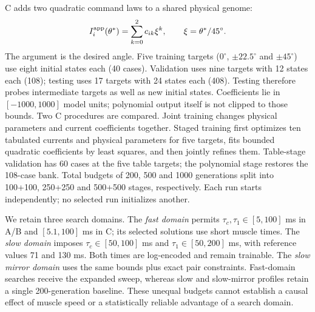 \documentclass{styles/svproc}
\begin{document}
C adds two quadratic command laws to a shared physical genome:
\begin{equation}
 I_i^{\rm app}(\theta^*)=\sum_{k=0}^{2}c_{ik}\xi^k,\qquad
 \xi=\theta^*/45^\circ.
 \label{eq:commands}
\end{equation}
The argument is the desired angle. Five training targets ($0^\circ$, $\pm22.5^\circ$ and $\pm45^\circ$) use eight initial states each (40 cases). Validation uses nine targets with 12 states each (108); testing uses 17 targets with 24 states each (408). Testing therefore probes intermediate targets as well as new initial states. Coefficients lie in $[-1000,1000]$ model units; polynomial output itself is not clipped to those bounds. Two C procedures are compared. Joint training changes physical parameters and current coefficients together. Staged training first optimizes ten tabulated currents and physical parameters for five targets, fits bounded quadratic coefficients by least squares, and then jointly refines them. Table-stage validation has 60 cases at the five table targets; the polynomial stage restores the 108-case bank. Total budgets of 200, 500 and 1000 generations split into 100+100, 250+250 and 500+500 stages, respectively. Each run starts independently; no selected run initializes another.

We retain three search domains. The \emph{fast domain} permits $\tau_c,\tau_1\in[5,100]$ ms in A/B and $[5.1,100]$ ms in C; its selected solutions use short muscle times. The \emph{slow domain} imposes $\tau_c\in[50,100]$ ms and $\tau_1\in[50,200]$ ms, with reference values 71 and 130 ms. Both times are log-encoded and remain trainable. The \emph{slow mirror domain} uses the same bounds plus exact pair constraints. Fast-domain searches receive the expanded sweep, whereas slow and slow-mirror profiles retain a single 200-generation baseline. These unequal budgets cannot establish a causal effect of muscle speed or a statistically reliable advantage of a search domain.
\end{document}

